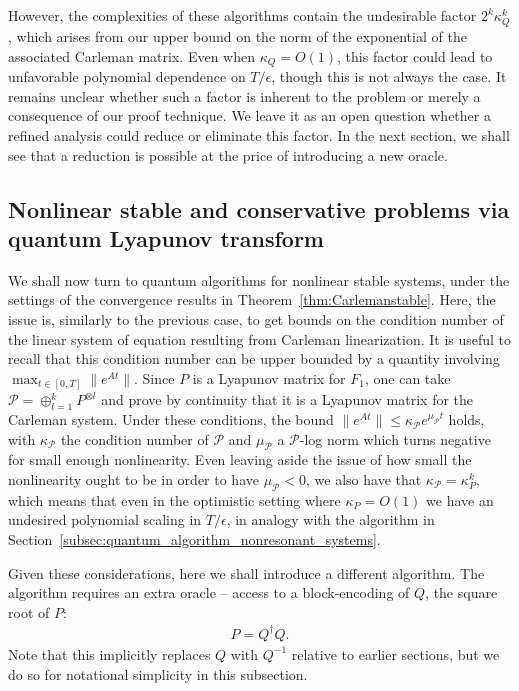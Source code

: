 \documentclass[superscriptaddress,onecolumn,nofootinbib,longbibliography,a4paper,accepted=2026-09-29]{quantumarticle}
\theoremstyle{plain}
\theoremstyle{definition}
\numberwithin{thm}{section}
\numberwithin{assumption}{section}
\numberwithin{lemma}{section}
\numberwithin{prop}{section}
\numberwithin{cor}{section}
\numberwithin{definition}{section}
\numberwithin{rmk}{section}
\numberwithin{equation}{section}
\newcommand{\lrb}[1]{\left ( #1 \right )}
\newcommand{\myO}[1]{O\lrb{#1}}
\begin{document}
However, the complexities of these algorithms contain the undesirable factor $2^k\kappa_Q^k$, which arises from our upper bound on the norm of the exponential of the associated Carleman matrix. Even when $\kappa_Q=\myO{1}$, this factor could lead to unfavorable polynomial dependence on $T/\epsilon$, though this is not always the case. It remains unclear whether such a factor is inherent to the problem or merely a consequence of our proof technique. We leave it as an open question whether a refined analysis could reduce or eliminate this factor. In the next section, we shall see that a reduction is possible at the price of introducing a new oracle.


\subsection{Nonlinear stable and conservative problems via quantum Lyapunov transform}
\label{subsec:quantum_algorithm_stable_conservative_systems}


We shall now turn to quantum algorithms for nonlinear stable systems, under the settings of the convergence results in Theorem~\ref{thm:Carlemanstable}. Here, the issue is, similarly to the previous case, to get bounds on the condition number of the linear system of equation resulting from Carleman linearization. It is useful to recall that this condition number can be upper bounded by a quantity involving $\max_{t \in [0,T]} \| e^{At}\|$. Since $P$ is a Lyapunov matrix for $F_1$, one can take $\mathcal{P} = \oplus_{l=1}^k P^{\otimes l}$ and prove by continuity that it is a Lyapunov matrix for the Carleman system. Under these conditions, the bound $\|e^{A t}\| \leq \kappa_{\mathcal{P}} e^{\mu_{\mathcal{P}}t}$ holds, with  $\kappa_{\mathcal{P}}$ the condition number of $\mathcal{P}$ and $\mu_{\mathcal{P}}$ a $\mathcal{P}$-log norm which turns negative for small enough nonlinearity. Even leaving aside the issue of how small the nonlinearity ought to be in order to have $\mu_{\mathcal{P}}<0$, we also have that $\kappa_{\mathcal{P}} = \kappa_P^k$, which means that even in the optimistic setting where $\kappa_{P} = \myO{1}$ we have an undesired polynomial scaling in $T/\epsilon$, in analogy with the algorithm in Section~\ref{subsec:quantum_algorithm_nonresonant_systems}.

Given these considerations, here we shall introduce a different algorithm. The algorithm requires an extra oracle -- access to a block-encoding of $Q$, the square root of $P$:
\begin{align}
    P = Q^\dag Q.
\end{align}
Note that this implicitly replaces $Q$ with $Q^{-1}$ relative to earlier sections, but we do so for notational simplicity in this subsection.
\end{document}
